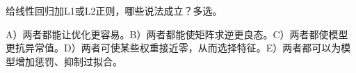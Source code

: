 给线性回归加L1或L2正则，哪些说法成立？多选。


A）两者都能让优化更容易。B）两者都能使矩阵求逆更良态。C）两者都使模型更抗异常值。D）两者可使某些权重接近零，从而选择特征。E）两者都可以为模型增加惩罚、抑制过拟合。
